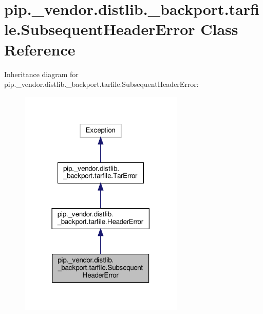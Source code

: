 \hypertarget{classpip_1_1__vendor_1_1distlib_1_1__backport_1_1tarfile_1_1SubsequentHeaderError}{}\section{pip.\+\_\+vendor.\+distlib.\+\_\+backport.\+tarfile.\+Subsequent\+Header\+Error Class Reference}
\label{classpip_1_1__vendor_1_1distlib_1_1__backport_1_1tarfile_1_1SubsequentHeaderError}


Inheritance diagram for pip.\+\_\+vendor.\+distlib.\+\_\+backport.\+tarfile.\+Subsequent\+Header\+Error\+:
\nopagebreak
\begin{figure}[H]
\begin{center}
\leavevmode
\includegraphics[width=222pt]{classpip_1_1__vendor_1_1distlib_1_1__backport_1_1tarfile_1_1SubsequentHeaderError__inherit__graph}
\end{center}
\end{figure}


